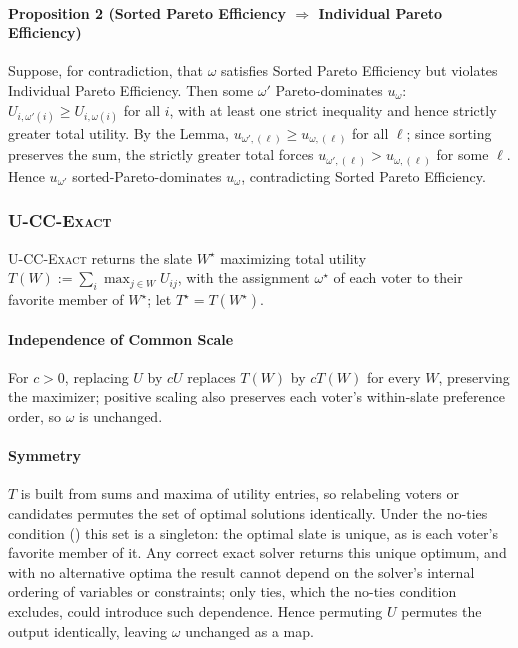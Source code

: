 \documentclass[letterpaper]{article} %
\newcommand{\Exact}{\textsc{U-CC-Exact}}
\begin{document}
\paragraph{Proposition 2 (Sorted Pareto Efficiency $\Rightarrow$ Individual Pareto Efficiency)} Suppose, for contradiction, that $\omega$ satisfies Sorted Pareto Efficiency but violates Individual Pareto Efficiency.
Then some $\omega'$ Pareto-dominates $u_\omega$: $U_{i,\omega'(i)}\ge U_{i,\omega(i)}$ for all $i$, with at least one strict inequality and hence strictly greater total utility.
By the Lemma, $u_{\omega',(\ell)}\ge u_{\omega,(\ell)}$ for all $\ell$; since sorting preserves the sum, the strictly greater total forces $u_{\omega',(\ell)}>u_{\omega,(\ell)}$ for some $\ell$.
Hence $u_{\omega'}$ sorted-Pareto-dominates $u_\omega$, contradicting Sorted Pareto Efficiency.

\subsubsection{\Exact{}} \label{app:exact-axiom-proofs}
\Exact{} returns the slate $W^\star$ maximizing total utility $T(W):=\sum_i\max_{j\in W}U_{ij}$, with the assignment $\omega^\star$ of each voter to their favorite member of $W^\star$; let $T^\star=T(W^\star)$.

\paragraph{Independence of Common Scale} For $c>0$, replacing $U$ by $cU$ replaces $T(W)$ by $cT(W)$ for every $W$, preserving the maximizer; positive scaling also preserves each voter's within-slate preference order, so $\omega$ is unchanged.

\paragraph{Symmetry} $T$ is built from sums and maxima of utility entries, so relabeling voters or candidates permutes the set of optimal solutions identically.
Under the no-ties condition () this set is a singleton: the optimal slate is unique, as is each voter's favorite member of it.
Any correct exact solver returns this unique optimum, and with no alternative optima the result cannot depend on the solver's internal ordering of variables or constraints; only ties, which the no-ties condition excludes, could introduce such dependence.
Hence permuting $U$ permutes the output identically, leaving $\omega$ unchanged as a map.
\end{document}
